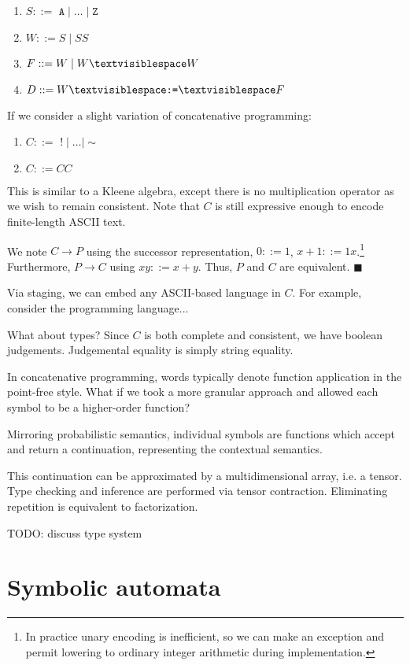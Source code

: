\documentclass[11pt]{article}
\begin{document}
\begin{enumerate}
  \item $S ::= $ $\texttt{A} \mid \ldots \mid \texttt{Z}$
  \item $W ::= S \mid SS$
  \item $F ::= W \mid W \textvisiblespace W$
  \item $D ::= W \textvisiblespace\texttt{:=}\textvisiblespace F$
\end{enumerate}

If we consider a slight variation of concatenative programming:

\begin{enumerate}
  \item $C ::= $ $! \mid \ldots \mid \sim$
  \item $C ::= CC$
\end{enumerate}

This is similar to a Kleene algebra, except there is no multiplication operator as we wish to remain consistent. Note that $C$ is still expressive enough to encode finite-length ASCII text.

We note $C → P$ using the successor representation, $0 ::= 1$, $x+1 ::= 1x$.\footnote{In practice unary encoding is inefficient, so we can make an exception and permit lowering to ordinary integer arithmetic during implementation.} Furthermore, $P \rightarrow C$ using $xy ::= x+y$. Thus, $P$ and $C$ are equivalent. $\blacksquare$

Via staging, we can embed any ASCII-based language in $C$. For example, consider the programming language...

What about types? Since $C$ is both complete and consistent, we have boolean judgements. Judgemental equality is simply string equality.

In concatenative programming, words typically denote function application in the point-free style. What if we took a more granular approach and allowed each symbol to be a higher-order function?

Mirroring probabilistic semantics, individual symbols are functions which accept and return a continuation, representing the contextual semantics.

This continuation can be approximated by a multidimensional array, i.e. a tensor. Type checking and inference are performed via tensor contraction. Eliminating repetition is equivalent to factorization.

TODO: discuss type system

\pagebreak
  \section{Symbolic automata}
\end{document}
